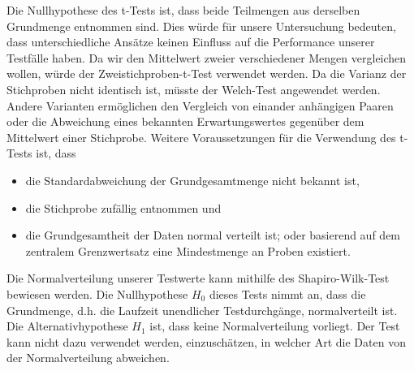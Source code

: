 Die Nullhypothese des t-Tests ist, dass beide Teilmengen aus derselben Grundmenge entnommen sind. Dies würde für unsere Untersuchung bedeuten, dass unterschiedliche Ansätze keinen Einfluss auf die Performance unserer Testfälle haben. Da wir den Mittelwert zweier verschiedener Mengen vergleichen wollen, würde der Zweistichproben-t-Test verwendet werden. Da die Varianz der Stichproben nicht identisch ist, müsste der Welch-Test angewendet werden. Andere Varianten ermöglichen den Vergleich von einander anhängigen Paaren oder die Abweichung eines bekannten Erwartungswertes gegenüber dem Mittelwert einer Stichprobe. Weitere Voraussetzungen für die Verwendung des t-Tests ist, dass
\begin{itemize}
\item die Standardabweichung der Grundgesamtmenge nicht bekannt ist,
\item die Stichprobe zufällig entnommen und
\item die Grundgesamtheit der Daten normal verteilt ist; oder basierend auf dem zentralem Grenzwertsatz eine Mindestmenge an Proben existiert.
\end{itemize}

Die Normalverteilung unserer Testwerte kann mithilfe des Shapiro-Wilk-Test bewiesen werden. Die Nullhypothese \textbf{$H_{0}$} dieses Tests nimmt an, dass die Grundmenge, d.h. die Laufzeit unendlicher Testdurchgänge, normalverteilt ist. Die Alternativhypothese \textbf{$H_{1}$} ist, dass keine Normalverteilung vorliegt. Der Test kann nicht dazu verwendet werden, einzuschätzen, in welcher Art die Daten von der Normalverteilung abweichen. \cite{Hedderich.2020}

